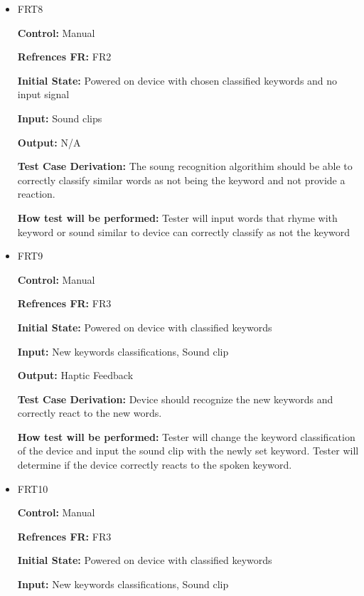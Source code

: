 \documentclass[12pt, titlepage]{article}
\begin{document}
\begin{itemize}
\item{FRT8}

\textbf{Control:} Manual

\textbf{Refrences FR:} FR2 					

\textbf{Initial State:} Powered on device with chosen classified keywords and no input signal  
					
\textbf{Input:} Sound clips
					
\textbf{Output:} N/A

\textbf{Test Case Derivation:} The soung recognition algorithim should be able to correctly classify similar words as not being the keyword and not provide a reaction.
					
\textbf{How test will be performed:} Tester will input words that rhyme with keyword or sound similar to device can correctly classify as not the keyword


\item{FRT9}

\textbf{Control:} Manual

\textbf{Refrences FR:} FR3 					

\textbf{Initial State:} Powered on device with classified keywords 
					
\textbf{Input:} New keywords classifications, Sound clip
					
\textbf{Output:} Haptic Feedback

\textbf{Test Case Derivation:} Device should recognize the new keywords and correctly react to the new words.
					
\textbf{How test will be performed:} Tester will change the keyword classification of the device and input the sound clip with the newly set keyword. Tester will determine if the device correctly reacts to the spoken keyword.


\item{FRT10}

\textbf{Control:} Manual

\textbf{Refrences FR:} FR3 					

\textbf{Initial State:} Powered on device with classified keywords
					
\textbf{Input:} New keywords classifications, Sound clip
					

\end{itemize}
\end{document}
